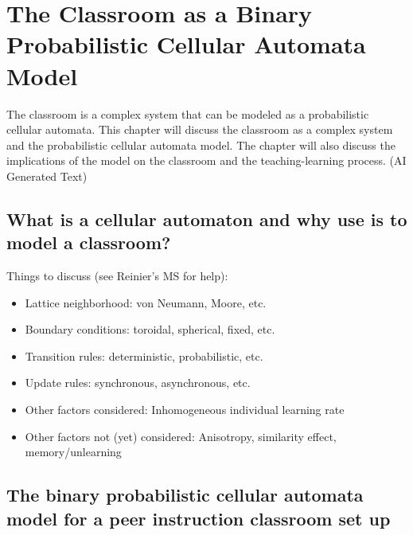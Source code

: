 \chapter{The Classroom as a Binary Probabilistic Cellular Automata Model}
\hspace{\parindent} The classroom is a complex system that can be modeled as a probabilistic cellular automata. This chapter will discuss the classroom as a complex system and the probabilistic cellular automata model. The chapter will also discuss the implications of the model on the classroom and the teaching-learning process. (AI Generated Text)

\section{What is a cellular automaton and why use is to model a classroom?}
\indent Things to discuss (see Reinier's MS for help):
\begin{itemize}
    \item Lattice neighborhood: von Neumann, Moore, etc.
    \item Boundary conditions: toroidal, spherical, fixed, etc.
    \item Transition rules: deterministic, probabilistic, etc.
    \item Update rules: synchronous, asynchronous, etc.
    \item Other factors considered: Inhomogeneous individual learning rate
    \item Other factors not (yet) considered: Anisotropy, similarity effect, memory/unlearning
\end{itemize}

\section{The binary probabilistic cellular automata model for a peer instruction classroom set up}

